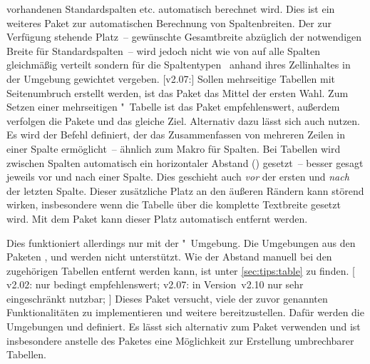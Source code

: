 \begin{DeclarePackages}
  vorhandenen Standardspalten  etc. automatisch berechnet wird.
  Dies ist ein weiteres Paket zur automatischen Berechnung von Spaltenbreiten. 
  Der zur Verfügung stehende Platz~-- gewünschte Gesamtbreite abzüglich der 
  notwendigen Breite für Standardspalten~-- wird jedoch nicht wie von 
   auf alle Spalten gleichmäßig verteilt sondern für die 
  Spaltentypen~ anhand ihres Zellinhaltes in der Umgebung 
  gewichtet vergeben.
[v2.07:]
  Sollen mehrseitige Tabellen mit Seitenumbruch erstellt werden, ist das Paket
   das Mittel der ersten Wahl. Zum Setzen einer mehrseitigen 
  "~Tabelle ist das Paket  
  empfehlenswert, außerdem verfolgen die Pakete  und 
   das gleiche Ziel. Alternativ dazu lässt sich auch 
   nutzen.
  Es wird der Befehl  definiert, der das Zusammenfassen von 
  mehreren Zeilen in einer Spalte ermöglicht~-- ähnlich zum Makro 
   für Spalten.
  Bei Tabellen wird zwischen Spalten automatisch ein horizontaler Abstand 
  () gesetzt~-- besser gesagt jeweils vor und nach einer 
  Spalte. Dies geschieht auch \emph{vor} der ersten und \emph{nach} der letzten 
  Spalte. Dieser zusätzliche Platz an den äußeren Rändern kann störend wirken, 
  insbesondere wenn die Tabelle über die komplette Textbreite gesetzt wird. Mit 
  dem Paket  kann dieser Platz automatisch entfernt 
  werden.
  
  Dies funktioniert allerdings nur mit der "~Umgebung. 
  Die Umgebungen aus den Paketen ,  und 
   werden nicht unterstützt. Wie der Abstand manuell bei den 
  zugehörigen Tabellen entfernt werden kann, ist unter \autoref{sec:tips:table} 
  zu finden.
[%
    v2.02: nur bedingt empfehlenswert;
    v2.07: in Version~v2.10 nur sehr eingeschränkt nutzbar;
  ]%
  Dieses Paket versucht, viele der zuvor genannten Funktionalitäten zu 
  implementieren und weitere bereitzustellen. Dafür werden die Umgebungen 
   und  definiert. Es lässt sich 
  alternativ zum Paket  verwenden und ist insbesondere 
  anstelle des Paketes  eine Möglichkeit zur Erstellung 
  umbrechbarer Tabellen.
  

\end{DeclarePackages}
